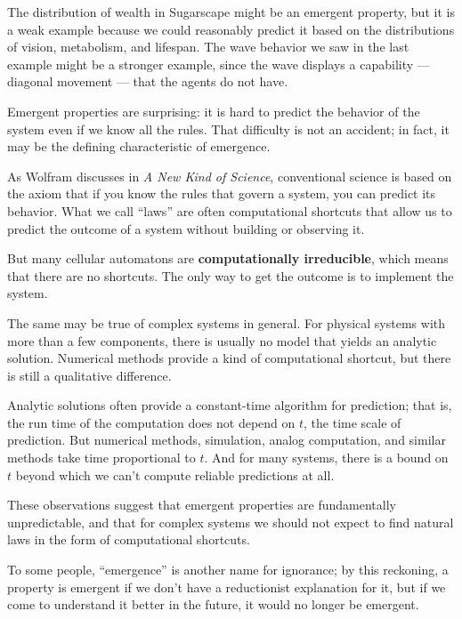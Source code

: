 \documentclass[12pt]{book}
\theoremstyle{exercise}
\begin{document}

The distribution of wealth in Sugarscape might be an emergent
property, but it is a weak example because we could
reasonably predict it based on the distributions of vision, metabolism,
and lifespan.  The wave behavior we saw in the last example might
be a stronger example, since the wave displays a capability --- diagonal
movement --- that the agents do not have.

Emergent properties are surprising: it is hard to predict the behavior
of the system even if we know all the rules.  That difficulty is not
an accident; in fact, it may be the defining characteristic of emergence.

As Wolfram discusses in {\em A New Kind of Science}, conventional science
is based on the axiom that if you know the rules that govern a system,
you can predict its behavior.  What we call ``laws'' are often
computational shortcuts that allow us to predict the outcome of a
system without building or observing it.


But many cellular automatons are {\bf computationally irreducible},
which means that there are no shortcuts.  The only way to get the
outcome is to implement the system.


The same may be true of complex systems in general.  For physical
systems with more than a few components, there is usually no model
that yields an analytic solution.  Numerical methods provide a kind of
computational shortcut, but there is still a qualitative difference.


Analytic solutions often provide a constant-time algorithm for
prediction; that is, the run time of the computation does not depend
on $t$, the time scale of prediction.  But numerical methods,
simulation, analog computation, and similar methods take time
proportional to $t$.  And for many systems, there is a bound on $t$
beyond which we can't compute reliable predictions at all.

These observations suggest that emergent properties are fundamentally
unpredictable, and that for complex systems we should not expect to
find natural laws in the form of computational shortcuts.

To some people, ``emergence'' is another name for ignorance; by this
reckoning, a property is emergent if we don't have a reductionist
explanation for it, but if we come to understand it better in the
future, it would no longer be emergent.
\end{document}
